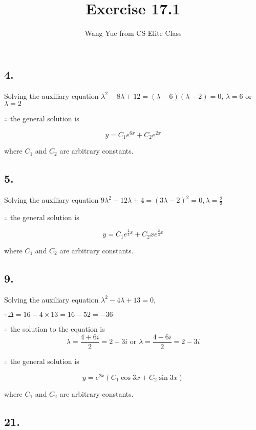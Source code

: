 \documentclass{article}
\begin{document}
  \title{Exercise 17.1}
  \author{Wang Yue from CS Elite Class}
  \maketitle

  \subsection*{4. }

  Solving the auxiliary equation $\lambda^2 - 8\lambda + 12 = (\lambda - 6)(\lambda - 2) = 0$, $\lambda = 6$ or $\lambda = 2$

  $\therefore$ the general solution is

  $$ y = C_1 e^{6x} + C_2 e^{2x}$$

  where $C_1$ and $C_2$ are arbitrary constants.

  \subsection*{5. }

  Solving the auxiliary equation $9\lambda^2 - 12\lambda + 4 = (3\lambda - 2)^2 = 0, \lambda = \frac 2 3$

  $\therefore$ the general solution is

  $$y = C_1 e^{\frac 2 3 x} + C_2 x e^{\frac 2 3 x}$$

  where $C_1$ and $C_2$ are arbitrary constants.

  \subsection*{9. }

  Solving the auxiliary equation $\lambda^2 - 4\lambda + 13 = 0$,

  $\because \Delta = 16 - 4 \times 13 = 16 - 52 = -36$

  $\therefore$ the solution to the equation is $$\lambda = \frac{4 + 6i}{2} = 2 + 3i \textrm{ or } \lambda = \frac{4 - 6i}{2} = 2 - 3i$$

  $\therefore$ the general solution is

  $$y = e^{2x} (C_1 \cos 3x + C_2 \sin 3x)$$

  where $C_1$ and $C_2$ are arbitrary constants.

  \subsection*{21. }
\end{document}
